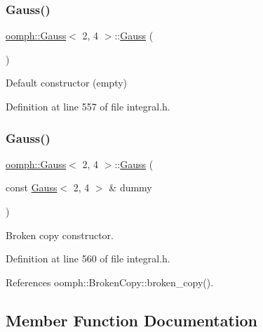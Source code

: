 \subsubsection{\texorpdfstring{Gauss()}{Gauss()}\hspace{0.1cm}{\footnotesize\ttfamily [1/2]}}
{\footnotesize\ttfamily \hyperlink{classoomph_1_1Gauss}{oomph\+::\+Gauss}$<$ 2, 4 $>$\+::\hyperlink{classoomph_1_1Gauss}{Gauss} (\begin{DoxyParamCaption}{ }\end{DoxyParamCaption})\hspace{0.3cm}{\ttfamily [inline]}}



Default constructor (empty) 



Definition at line 557 of file integral.\+h.

\mbox{\label{classoomph_1_1Gauss_3_012_00_014_01_4_a48e0cd672d481451de0a6b1f002f5d55}} 
\subsubsection{\texorpdfstring{Gauss()}{Gauss()}\hspace{0.1cm}{\footnotesize\ttfamily [2/2]}}
{\footnotesize\ttfamily \hyperlink{classoomph_1_1Gauss}{oomph\+::\+Gauss}$<$ 2, 4 $>$\+::\hyperlink{classoomph_1_1Gauss}{Gauss} (\begin{DoxyParamCaption}\item[{const \hyperlink{classoomph_1_1Gauss}{Gauss}$<$ 2, 4 $>$ \&}]{dummy }\end{DoxyParamCaption})\hspace{0.3cm}{\ttfamily [inline]}}



Broken copy constructor. 



Definition at line 560 of file integral.\+h.



References oomph\+::\+Broken\+Copy\+::broken\+\_\+copy().



\subsection{Member Function Documentation}
\mbox{\label{classoomph_1_1Gauss_3_012_00_014_01_4_a65b2c751dd15ba81999821da3c406f2d}} 
